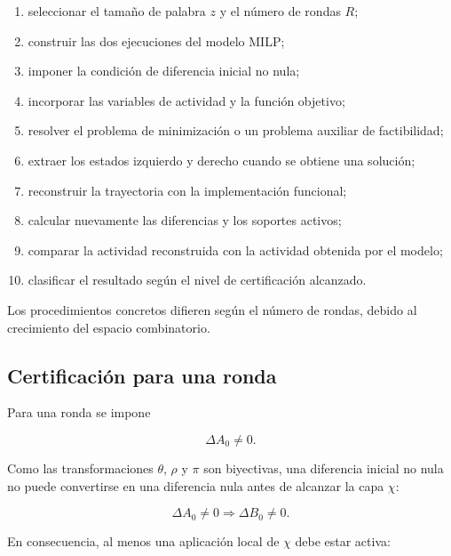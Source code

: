 \begin{enumerate}
    \item seleccionar el tamaño de palabra $z$ y el número de rondas $R$;

    \item construir las dos ejecuciones del modelo MILP;

    \item imponer la condición de diferencia inicial no nula;

    \item incorporar las variables de actividad y la función objetivo;

    \item resolver el problema de minimización o un problema auxiliar de
    factibilidad;

    \item extraer los estados izquierdo y derecho cuando se obtiene una
    solución;

    \item reconstruir la trayectoria con la implementación funcional;

    \item calcular nuevamente las diferencias y los soportes activos;

    \item comparar la actividad reconstruida con la actividad obtenida por
    el modelo;

    \item clasificar el resultado según el nivel de certificación
    alcanzado.
\end{enumerate}

Los procedimientos concretos difieren según el número de rondas, debido al
crecimiento del espacio combinatorio.


\subsection{Certificación para una ronda}
\label{subsec:certificacion_una_ronda}

Para una ronda se impone

\[
\Delta A_0 \neq 0.
\]

Como las transformaciones $\theta$, $\rho$ y $\pi$ son biyectivas, una
diferencia inicial no nula no puede convertirse en una diferencia nula
antes de alcanzar la capa $\chi$:

\[
\Delta A_0 \neq 0
\Longrightarrow
\Delta B_0 \neq 0.
\]

En consecuencia, al menos una aplicación local de $\chi$ debe estar
activa:

